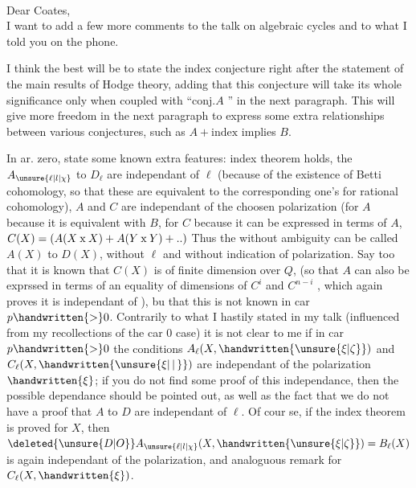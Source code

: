 \hfill{}\\
Dear Coates,\\

I want to add a few more comments to the talk on algebraic cycles
and to what I told you on the phone.

I think the best will be to state the index conjecture right after
the statement of the main results of Hodge theory, adding that this conjecture
will take its whole significance only when coupled with ``conj.$A$ ''
in the next paragraph. This will give more freedom in the next paragraph
to express some extra relationships between various conjectures, such
as $A+\text{index}$ implies $B$.

In ar. zero, state some known extra features: index theorem holds,
the  $A_{\unsure{\ell|l|\chi}}$ to $D_{\ell}$ are independant of $\ell$ (because of the existence
of Betti cohomology, so that these  are equivalent to the
corresponding one's for rational cohomology),  $A$ and $C$ are independant
of the choosen polarization (for $A$ because it is equivalent with $B$, for
$C$ because it can be expressed in terms of $A$, $C(X)=(A(X\mathbin{\mathrm{x}}X)+A(Y\mathbin{\mathrm{x}}Y)+\mathinner{..})$
Thus the  without ambiguity can be called $A(X)$ to $D(X)$,
without  $\ell$ and without indication of polarization. Say too that
it is known that $C(X)$ is of finite dimension over \uline{$Q$}, (so that $A$ can also
be exprssed in terms of an equality of dimensions of $C^{i}$ and $C^{n-i}$\deleted{\unsure{)|$\chi$}} , which
again proves it is independant of \hspace{1em}), bu that this is not known in
car $p\handwritten{>}0$. Contrarily to what I hastily stated in my talk (influenced
from my recollections of the car $0$ case) it is not clear to me if in car
$p\handwritten{>}0$ the conditions  $A_{\ell}(X,\handwritten{\unsure{\xi|\zeta}})$ and $C_{\ell}(X,\handwritten{\unsure{\xi|\,\vert\,}})$ are independant of the
polarization $\handwritten{\xi}$; if you do not find some proof of this independance, then
the possible dependance should be pointed out, as well as the fact that 
 we do not have a proof that $A$ to $D$ are independant of $\ell$. Of cour%
%
se, if the index theorem is proved for $X$, then $\deleted{\unsure{D|O}}A_{\unsure{\ell|l|\chi}}(X,\handwritten{\unsure{\xi|\zeta}})=B_{\ell}(X)$ is again
independant of the polarization, and analoguous remark for $C_{\ell}(X,\handwritten{\xi})$.

